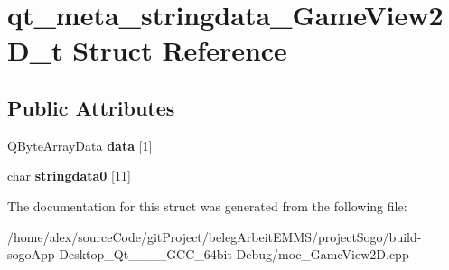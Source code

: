 \hypertarget{structqt__meta__stringdata__GameView2D__t}{\section{qt\-\_\-meta\-\_\-stringdata\-\_\-\-Game\-View2\-D\-\_\-t Struct Reference}
\label{structqt__meta__stringdata__GameView2D__t}
}
\subsection*{Public Attributes}
\begin{DoxyCompactItemize}
\item 
\hypertarget{structqt__meta__stringdata__GameView2D__t_a5e3f873f934f722afbccab01aaa26997}{Q\-Byte\-Array\-Data {\bfseries data} \mbox{[}1\mbox{]}}\label{structqt__meta__stringdata__GameView2D__t_a5e3f873f934f722afbccab01aaa26997}

\item 
\hypertarget{structqt__meta__stringdata__GameView2D__t_a7e8bbccfa9f5238570de6fcaa4186d58}{char {\bfseries stringdata0} \mbox{[}11\mbox{]}}\label{structqt__meta__stringdata__GameView2D__t_a7e8bbccfa9f5238570de6fcaa4186d58}

\end{DoxyCompactItemize}


The documentation for this struct was generated from the following file\-:\begin{DoxyCompactItemize}
\item 
/home/alex/source\-Code/git\-Project/beleg\-Arbeit\-E\-M\-M\-S/project\-Sogo/build-\/sogo\-App-\/\-Desktop\-\_\-\-Qt\-\_\-\_\-\_\-\_\-\-G\-C\-C\-\_\-64bit-\/\-Debug/moc\-\_\-\-Game\-View2\-D.\-cpp\end{DoxyCompactItemize}
